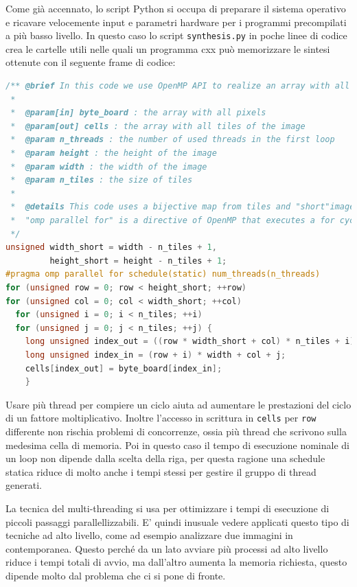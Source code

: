 \begin{toDo}
    \noindent Come già accennato, lo script \gls{Python} si occupa di preparare il sistema operativo e ricavare velocemente input e parametri hardware per i programmi precompilati a più basso livello. In questo caso lo script \texttt{synthesis.py} in poche linee di codice crea le cartelle utili nelle quali un programma \gls{cxx} può memorizzare le sintesi ottenute con il seguente frame di codice:

\begin{lstlisting}[style=code, language=C, rulecolor=\color{blue}]
/** @brief In this code we use OpenMP API to realize an array with all tiles.
 *
 *  @param[in] byte_board : the array with all pixels
 *  @param[out] cells : the array with all tiles of the image
 *  @param n_threads : the number of used threads in the first loop
 *  @param height : the height of the image
 *  @param width : the width of the image
 *  @param n_tiles : the size of tiles
 *
 *  @details This code uses a bijective map from tiles and "short"image, i.e. an image with shape width_short, height_short. Each tiles will be assigned to its first pixel (up/sx).
 *  "omp parallel for" is a directive of OpenMP that executes a for cycle using more indipendent threads. In this case the schedule is "static" i.e. each thread knows in advance all its loops.
 */
unsigned width_short = width - n_tiles + 1,
         height_short = height - n_tiles + 1;
#pragma omp parallel for schedule(static) num_threads(n_threads)
for (unsigned row = 0; row < height_short; ++row)
for (unsigned col = 0; col < width_short; ++col)
  for (unsigned i = 0; i < n_tiles; ++i)
  for (unsigned j = 0; j < n_tiles; ++j) {
    long unsigned index_out = ((row * width_short + col) * n_tiles + i) * n_tiles + j; // [row-i, col-j, i,j]
    long unsigned index_in = (row + i) * width + col + j;
    cells[index_out] = byte_board[index_in];
    }\end{lstlisting}

    \noindent Usare più \gls{thread} per compiere un ciclo aiuta ad aumentare le prestazioni del ciclo di un fattore moltiplicativo. Inoltre l'accesso in scrittura in \texttt{cells} per \texttt{row} differente non rischia problemi di concorrenze, ossia più \gls{thread} che scrivono sulla medesima cella di memoria. Poi in questo caso il tempo di esecuzione nominale di un loop non dipende dalla scelta della riga, per questa ragione una schedule statica riduce di molto anche i tempi stessi per gestire il gruppo di thread generati.

    \noindent La tecnica del multi-threading si usa per ottimizzare i tempi di esecuzione di piccoli passaggi parallellizzabili. E' quindi inusuale vedere applicati questo tipo di tecniche ad alto livello, come ad esempio analizzare due immagini in contemporanea. Questo perché da un lato avviare più processi ad alto livello riduce i tempi totali di avvio, ma dall'altro aumenta la memoria richiesta, questo dipende molto dal problema che ci si pone di fronte.


\end{toDo}

